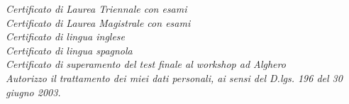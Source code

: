 \documentclass[a4paper,12pt]{article} %
\begin{document}






\Sep %


\textit{Certificato di Laurea Triennale con esami}\\
\textit{Certificato di Laurea Magistrale con esami}\\
\textit{Certificato di lingua inglese}\\
\textit{Certificato di lingua spagnola}\\
\textit{Certificato di superamento del test finale al workshop ad Alghero}\\

\bigskip
\textit{Autorizzo il trattamento dei miei dati personali, ai sensi del D.lgs. 196 del 30 giugno 2003.}\\
\end{document}
